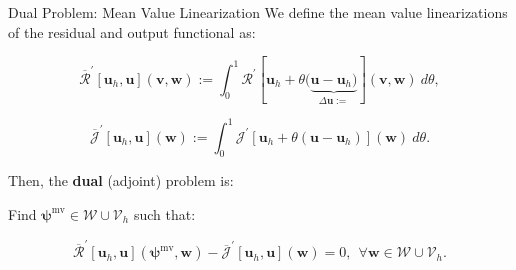 \documentclass{beamer}
\newcounter{sectionframecount}
\begin{document}
\begin{frame}[t]{Dual Problem: Mean Value Linearization}
  We define the mean value linearizations of the residual and output functional as:

  \begin{equation}
     \overline{\mathcal{R}}^\prime [\boldsymbol{u}_h,\boldsymbol{u}](\boldsymbol{v},\boldsymbol{w}) := \int_0^1 \mathcal{R}^\prime[\boldsymbol{u}_h + \theta(\underbrace{\boldsymbol{u}-\boldsymbol{u}_h)}_{\Delta \boldsymbol{u}:=}] (\boldsymbol{v},\boldsymbol{w})~d\theta,
  \end{equation}

  \begin{equation}
      \overline{\mathcal{J}}^\prime [\boldsymbol{u}_h,\boldsymbol{u}](\boldsymbol{w}) := \int_0^1 \mathcal{J}^\prime [\boldsymbol{u}_h + \theta(\boldsymbol{u}-\boldsymbol{u}_h)](\boldsymbol{w})~d\theta.
  \end{equation}

  \vspace{10pt}
  Then, the \textbf{dual} (adjoint) problem is:

  \vspace{10pt}
  Find $\boldsymbol{\psi}^\text{mv} \in \mathcal{W} \cup \mathcal{V}_{h}$ such that:

  \begin{equation}
      \overline{\mathcal{R}}^\prime[\boldsymbol{u}_h,\boldsymbol{u}](\boldsymbol{\psi}^\text{mv},\boldsymbol{w}) - \overline{\mathcal{J}}^\prime[\boldsymbol{u}_h,\boldsymbol{u}](\boldsymbol{w}) = 0, ~~\forall \boldsymbol{w} \in \mathcal{W} \cup \mathcal{V}_h.
  \end{equation}

\end{frame}

\end{document}
